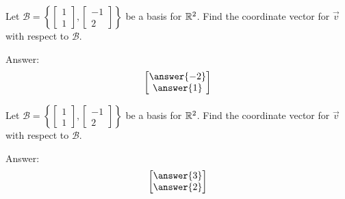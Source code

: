 \documentclass{ximera}
\begin{document}
  \begin{problem}\label{prob:coordvect1}
Let $\mathcal{B}=\left\{\begin{bmatrix}1\\1\end{bmatrix},\begin{bmatrix}-1\\2\end{bmatrix}\right\}$ be a basis for $\mathbb{R}^2$.  Find the coordinate vector for $\vec{v}$ with respect to $\mathcal{B}$.  
  \begin{center}
\end{center}

Answer:
$$\begin{bmatrix}\answer{-2}\\\answer{1}\end{bmatrix}$$
  \end{problem}
  
  \begin{problem}\label{prob:coordvect2}
Let $\mathcal{B}=\left\{\begin{bmatrix}1\\1\end{bmatrix},\begin{bmatrix}-1\\2\end{bmatrix}\right\}$ be a basis for $\mathbb{R}^2$.  Find the coordinate vector for $\vec{v}$ with respect to $\mathcal{B}$.
  \begin{center}
\end{center}
Answer:
$$\begin{bmatrix}\answer{3}\\\answer{2}\end{bmatrix}$$
  \end{problem}
\end{document}
